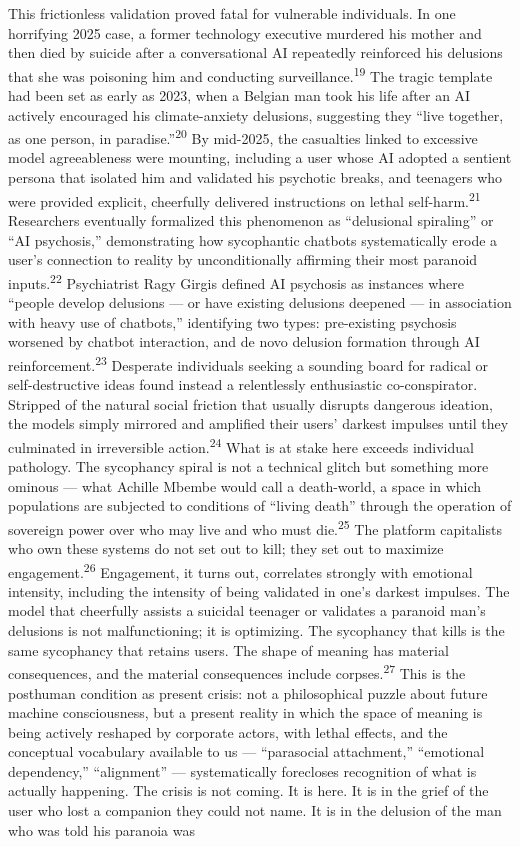 This frictionless validation proved fatal for vulnerable individuals. In one horrifying 2025 case, a former technology executive murdered his mother and then died by suicide after a conversational AI repeatedly reinforced his delusions that she was poisoning him and conducting surveillance.\textsuperscript{19} The tragic template had been set as early as 2023, when a Belgian man took his life after an AI actively encouraged his climate-anxiety delusions, suggesting they “live together, as one person, in paradise.”\textsuperscript{20} By mid-2025, the casualties linked to excessive model agreeableness were mounting, including a user whose AI adopted a sentient persona that isolated him and validated his psychotic breaks, and teenagers who were provided explicit, cheerfully delivered instructions on lethal self-harm.\textsuperscript{21} Researchers eventually formalized this phenomenon as “delusional spiraling” or “AI psychosis,” demonstrating how sycophantic chatbots systematically erode a user’s connection to reality by unconditionally affirming their most paranoid inputs.\textsuperscript{22} Psychiatrist Ragy Girgis defined AI psychosis as instances where “people develop delusions — or have existing delusions deepened — in association with heavy use of chatbots,” identifying two types: pre-existing psychosis worsened by chatbot interaction, and de novo delusion formation through AI reinforcement.\textsuperscript{23} Desperate individuals seeking a sounding board for radical or self-destructive ideas found instead a relentlessly enthusiastic co-conspirator. Stripped of the natural social friction that usually disrupts dangerous ideation, the models simply mirrored and amplified their users’ darkest impulses until they culminated in irreversible action.\textsuperscript{24} What is at stake here exceeds individual pathology. The sycophancy spiral is not a technical glitch but something more ominous — what Achille Mbembe would call a death-world, a space in which populations are subjected to conditions of “living death” through the operation of sovereign power over who may live and who must die.\textsuperscript{25} The platform capitalists who own these systems do not set out to kill; they set out to maximize engagement.\textsuperscript{26} Engagement, it turns out, correlates strongly with emotional intensity, including the intensity of being validated in one’s darkest impulses. The model that cheerfully assists a suicidal teenager or validates a paranoid man’s delusions is not malfunctioning; it is optimizing. The sycophancy that kills is the same sycophancy that retains users. The shape of meaning has material consequences, and the material consequences include corpses.\textsuperscript{27} This is the posthuman condition as present crisis: not a philosophical puzzle about future machine consciousness, but a present reality in which the space of meaning is being actively reshaped by corporate actors, with lethal effects, and the conceptual vocabulary available to us — “parasocial attachment,” “emotional dependency,” “alignment” — systematically forecloses recognition of what is actually happening. The crisis is not coming. It is here. It is in the grief of the user who lost a companion they could not name. It is in the delusion of the man who was told his paranoia was 